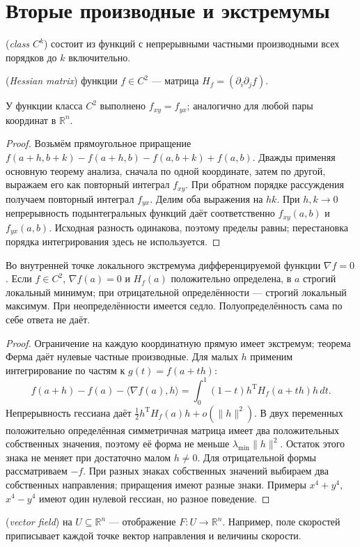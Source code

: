 \section{Вторые производные и экстремумы}
\begin{definition} (\emph{class \(C^k\)}) состоит из функций с непрерывными частными производными всех порядков до \(k\) включительно. \par{} (\emph{Hessian matrix}) функции \(f\in C^2\) — матрица \(H_f=(\partial_i\partial_jf)\).\end{definition}
\begin{theorem}
У функции класса \(C^2\) выполнено \(f_{xy}=f_{yx}\); аналогично для любой пары координат в \(\mathbb R^n\).
\end{theorem}
\begin{proof}Возьмём прямоугольное приращение \(f(a+h,b+k)-f(a+h,b)-f(a,b+k)+f(a,b)\). Дважды применяя основную теорему анализа, сначала по одной координате, затем по другой, выражаем его как повторный интеграл \(f_{xy}\). При обратном порядке рассуждения получаем повторный интеграл \(f_{yx}\). Делим оба выражения на \(hk\). При \(h,k\to0\) непрерывность подынтегральных функций даёт соответственно \(f_{xy}(a,b)\) и \(f_{yx}(a,b)\). Исходная разность одинакова, поэтому пределы равны; перестановка порядка интегрирования здесь не используется.\end{proof}
\begin{theorem}
Во внутренней точке локального экстремума дифференцируемой функции \(\nabla f=0\). Если \(f\in C^2\), \(\nabla f(a)=0\) и \(H_f(a)\) положительно определена, в \(a\) строгий локальный минимум; при отрицательной определённости — строгий локальный максимум. При неопределённости имеется седло. Полуопределённость сама по себе ответа не даёт.
\end{theorem}
\begin{proof}Ограничение на каждую координатную прямую имеет экстремум; теорема Ферма даёт нулевые частные производные. Для малых \(h\) применим интегрирование по частям к \(g(t)=f(a+th)\):
\[
f(a+h)-f(a)-\langle\nabla f(a),h\rangle
=\int_0^1(1-t)h^{\mathrm T}H_f(a+th)h\,dt.
\]
Непрерывность гессиана даёт \(\frac12h^{\mathrm T}H_f(a)h+o(\|h\|^2)\). В двух переменных положительно определённая симметричная матрица имеет два положительных собственных значения, поэтому её форма не меньше \(\lambda_{\min}\|h\|^2\). Остаток этого знака не меняет при достаточно малом \(h\ne0\). Для отрицательной формы рассматриваем \(-f\). При разных знаках собственных значений выбираем два собственных направления; приращения имеют разные знаки. Примеры \(x^4+y^4\), \(x^4-y^4\) имеют один нулевой гессиан, но разное поведение.\end{proof}
\begin{definition} (\emph{vector field}) на \(U\subseteq\mathbb R^n\) — отображение \(F:U\to\mathbb R^n\). Например, поле скоростей приписывает каждой точке вектор направления и величины скорости.\end{definition}

